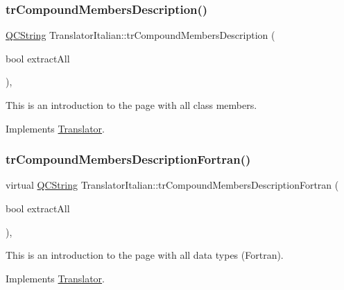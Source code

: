 \subsubsection{\texorpdfstring{trCompoundMembersDescription()}{trCompoundMembersDescription()}}
{\footnotesize\ttfamily \mbox{\hyperlink{class_q_c_string}{Q\+C\+String}} Translator\+Italian\+::tr\+Compound\+Members\+Description (\begin{DoxyParamCaption}\item[{bool}]{extract\+All }\end{DoxyParamCaption})\hspace{0.3cm}{\ttfamily [inline]}, {\ttfamily [virtual]}}

This is an introduction to the page with all class members. 

Implements \mbox{\hyperlink{class_translator}{Translator}}.

\mbox{\label{class_translator_italian_a539ce79f5dcf69caa854b7425a2146e0}} 
\subsubsection{\texorpdfstring{trCompoundMembersDescriptionFortran()}{trCompoundMembersDescriptionFortran()}}
{\footnotesize\ttfamily virtual \mbox{\hyperlink{class_q_c_string}{Q\+C\+String}} Translator\+Italian\+::tr\+Compound\+Members\+Description\+Fortran (\begin{DoxyParamCaption}\item[{bool}]{extract\+All }\end{DoxyParamCaption})\hspace{0.3cm}{\ttfamily [inline]}, {\ttfamily [virtual]}}

This is an introduction to the page with all data types (Fortran). 

Implements \mbox{\hyperlink{class_translator}{Translator}}.

\mbox{\label{class_translator_italian_acab289997cda5bb70b87379b990eb038}} 
